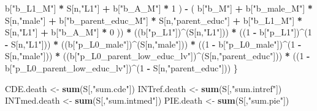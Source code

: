 \documentclass[
]{book}
\newenvironment{Shaded}{\begin{snugshade}}{\end{snugshade}}
\newcommand{\DecValTok}[1]{\textcolor[rgb]{0.00,0.00,0.81}{#1}}
\newcommand{\FunctionTok}[1]{\textcolor[rgb]{0.13,0.29,0.53}{\textbf{#1}}}
\newcommand{\NormalTok}[1]{#1}
\newcommand{\OtherTok}[1]{\textcolor[rgb]{0.56,0.35,0.01}{#1}}
\newcommand{\SpecialCharTok}[1]{\textcolor[rgb]{0.81,0.36,0.00}{\textbf{#1}}}
\newcommand{\StringTok}[1]{\textcolor[rgb]{0.31,0.60,0.02}{#1}}
\begin{document}
\begin{Shaded}
\begin{Highlighting}[]
\NormalTok{            b[}\StringTok{"b\_L1\_M"}\NormalTok{] }\SpecialCharTok{*}\NormalTok{ S[n,}\StringTok{"L1"}\NormalTok{] }\SpecialCharTok{+}
\NormalTok{            b[}\StringTok{"b\_A\_M"}\NormalTok{] }\SpecialCharTok{*} \DecValTok{1}\NormalTok{ ) }\SpecialCharTok{{-}} 
\NormalTok{          ( b[}\StringTok{"b\_M"}\NormalTok{] }\SpecialCharTok{+} 
\NormalTok{              b[}\StringTok{"b\_male\_M"}\NormalTok{] }\SpecialCharTok{*}\NormalTok{ S[n,}\StringTok{"male"}\NormalTok{] }\SpecialCharTok{+} 
\NormalTok{              b[}\StringTok{"b\_parent\_educ\_M"}\NormalTok{] }\SpecialCharTok{*}\NormalTok{ S[n,}\StringTok{"parent\_educ"}\NormalTok{] }\SpecialCharTok{+} 
\NormalTok{              b[}\StringTok{"b\_L1\_M"}\NormalTok{] }\SpecialCharTok{*}\NormalTok{ S[n,}\StringTok{"L1"}\NormalTok{] }\SpecialCharTok{+}
\NormalTok{              b[}\StringTok{"b\_A\_M"}\NormalTok{] }\SpecialCharTok{*} \DecValTok{0}\NormalTok{ )) }\SpecialCharTok{*} 
\NormalTok{      ((b[}\StringTok{"p\_L1"}\NormalTok{])}\SpecialCharTok{\^{}}\NormalTok{(S[n,}\StringTok{"L1"}\NormalTok{])) }\SpecialCharTok{*}
\NormalTok{      ((}\DecValTok{1} \SpecialCharTok{{-}}\NormalTok{ b[}\StringTok{"p\_L1"}\NormalTok{])}\SpecialCharTok{\^{}}\NormalTok{(}\DecValTok{1} \SpecialCharTok{{-}}\NormalTok{ S[n,}\StringTok{"L1"}\NormalTok{])) }\SpecialCharTok{*}
\NormalTok{      ((b[}\StringTok{"p\_L0\_male"}\NormalTok{])}\SpecialCharTok{\^{}}\NormalTok{(S[n,}\StringTok{"male"}\NormalTok{])) }\SpecialCharTok{*} 
\NormalTok{      ((}\DecValTok{1} \SpecialCharTok{{-}}\NormalTok{ b[}\StringTok{"p\_L0\_male"}\NormalTok{])}\SpecialCharTok{\^{}}\NormalTok{(}\DecValTok{1} \SpecialCharTok{{-}}\NormalTok{ S[n,}\StringTok{"male"}\NormalTok{])) }\SpecialCharTok{*} 
\NormalTok{      ((b[}\StringTok{"p\_L0\_parent\_low\_educ\_lv"}\NormalTok{])}\SpecialCharTok{\^{}}\NormalTok{(S[n,}\StringTok{"parent\_educ"}\NormalTok{])) }\SpecialCharTok{*}
\NormalTok{      ((}\DecValTok{1} \SpecialCharTok{{-}}\NormalTok{ b[}\StringTok{"p\_L0\_parent\_low\_educ\_lv"}\NormalTok{])}\SpecialCharTok{\^{}}\NormalTok{(}\DecValTok{1} \SpecialCharTok{{-}}\NormalTok{ S[n,}\StringTok{"parent\_educ"}\NormalTok{])) }
\NormalTok{    \}}
  
\NormalTok{  CDE.death }\OtherTok{\textless{}{-}} \FunctionTok{sum}\NormalTok{(S[,}\StringTok{"sum.cde"}\NormalTok{])}
\NormalTok{  INTref.death }\OtherTok{\textless{}{-}} \FunctionTok{sum}\NormalTok{(S[,}\StringTok{"sum.intref"}\NormalTok{])}
\NormalTok{  INTmed.death }\OtherTok{\textless{}{-}} \FunctionTok{sum}\NormalTok{(S[,}\StringTok{"sum.intmed"}\NormalTok{])}
\NormalTok{  PIE.death }\OtherTok{\textless{}{-}} \FunctionTok{sum}\NormalTok{(S[,}\StringTok{"sum.pie"}\NormalTok{])}
  

\end{Highlighting}
\end{Shaded}
\end{document}
